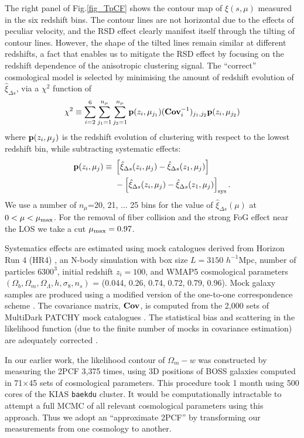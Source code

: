 \documentclass[prl,twocolumn,superscriptaddress,aps,amsmath,amssymb,nofootinbib,altaffilletter]{revtex4}
\begin{document}
The right panel of Fig.\ref{fig_TpCF} shows the contour map of $\xi(s,\mu)$ measured in the six redshift bins.
The contour lines are not horizontal due to the effects of peculiar velocity,
and the RSD effect clearly manifest itself through the tilting of contour lines.
However, the shape of the tilted lines remain similar at different redshifts, a fact that enables us  to mitigate the RSD effect by focusing on the redshift dependence of the anisotropic clustering signal.
The ``correct'' cosmological model is selected by minimising the amount of redshift evolution of $\hat\xi_{\Delta s}$,
via a $\chi^2$ function of 
\begin{equation}
 \chi^2\equiv \sum_{i=2}^{6} \sum_{j_1=1}^{n_{\mu}} \sum_{j_2=1}^{n_{\mu}} {\bf p}(z_i,\mu_{j_1}) ({\bf Cov}_{i}^{-1})_{j_1,j_2}  {\bf p}(z_i,\mu_{j_2})
\end{equation}
where ${\bf p}(z_i,\mu_{j})$ is the redshift evolution of clustering with respect to the lowest redshift bin,
while subtracting systematic effects:
\begin{eqnarray}
 {\bf p}(z_i,\mu_{j}) \equiv\ & \left[\hat\xi_{\Delta s}(z_i,\mu_j)-\hat\xi_{\Delta s}(z_1,\mu_j)\right] \\ \nonumber
 &- \left[\hat\xi_{\Delta s}(z_i,\mu_j)-\hat\xi_{\Delta s}(z_1,\mu_j)\right]_{\rm sys}.
\end{eqnarray}
We use a number of $n_{\mu}$=20, 21, ... 25 bins for the value of $\hat\xi_{\Delta s}(\mu)$ at $0<\mu<\mu_{\rm max}$.
For the removal of fiber collision and the strong FoG effect near the LOS we take a cut $\mu_{\rm max} = 0.97$.

Systematics effects are estimated using mock catalogues derived from Horizon Run 4 (HR4) \cite{HR4},
an N-body simulation with box size $L={3150}$ $h^{-1}$Mpc, number of particles $6300^3$,   
initial redshift $z_{i}=100$, and WMAP5\citep{komatsu2011} cosmological parameters 
$(\Omega_{b},\Omega_{m},\Omega_\Lambda,h,\sigma_8,n_s)$  = (0.044, 0.26, 0.74, 0.72, 0.79, 0.96). 
Mock galaxy samples are produced using a modified version of the one-to-one correspondence scheme \citep{hong2016}. 
The covariance matrix, ${\bf Cov}$, is computed from the 2,000 sets of MultiDark PATCHY mock catalogues \citep{MDPATCHY}.
The statistical bias and scattering in the likelihood function (due to the finite number of mocks in covariance estimation) 
are adequately corrected \citep{Hartlap,Percival2014}.

In our earlier work\cite{Li2016}, the likelihood contour of $\Omega_m-w$ was constructed by
measuring the 2PCF 3,375 times,
using 3D positions of BOSS galaxies computed in 71$\times$45 sets of cosmological parameters.
This procedure took 1 month using 500 cores of the KIAS {\texttt {baekdu}} cluster.
It would be computationally intractable to attempt a full MCMC of all relevant cosmological parameters using this approach. 
Thus we adopt an ``approximate 2PCF'' by transforming our measurements from one cosmology to another.
\end{document}
